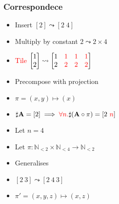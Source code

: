 \documentclass[xetex,mathserif,serif]{beamer}
\newcommand\mrm[1]{\mathrm{#1}}
\newcommand\brm[1]{\bm{\mrm{#1}}}
\newcommand\Nat{\mathbb{N}}
\newcommand\NB[1]{\textcolor{red}{#1}}
\begin{document}
\begin{frame}
  \frametitle{Correspondece}
  \begin{itemize}[<+->]
    \item Insert $[2] \leadsto [2\;4]$
    \item Multiply by constant $2\leadsto 2\times 4$
    \item \NB{Tile} $
      \begin{bmatrix} 1 \\ 2 \end{bmatrix}\leadsto
      \begin{bmatrix} 1 & \NB 1 & \NB 1 & \NB  1 \\ 2 & \NB 2 & \NB 2 & \NB 2 \end{bmatrix}
    $
    \item Precompose with projection
    \item $\pi = (x, y) \mapsto (x)$
    \item $\sharp \brm A = [2] \implies \NB{\forall n.} \sharp(\brm A \circ \pi) = [2\ \NB n]$
    \item Let $n = 4$
    \item Let $\pi : \Nat_{<2} \times \Nat_{<4} \to \Nat_{<2}$
    \item Generalises
    \item $[2\ 3] \leadsto [2\ 4\ 3]$
    \item $\pi' = (x, y, z) \mapsto (x, z)$
  \end{itemize}
\end{frame}
\end{document}
